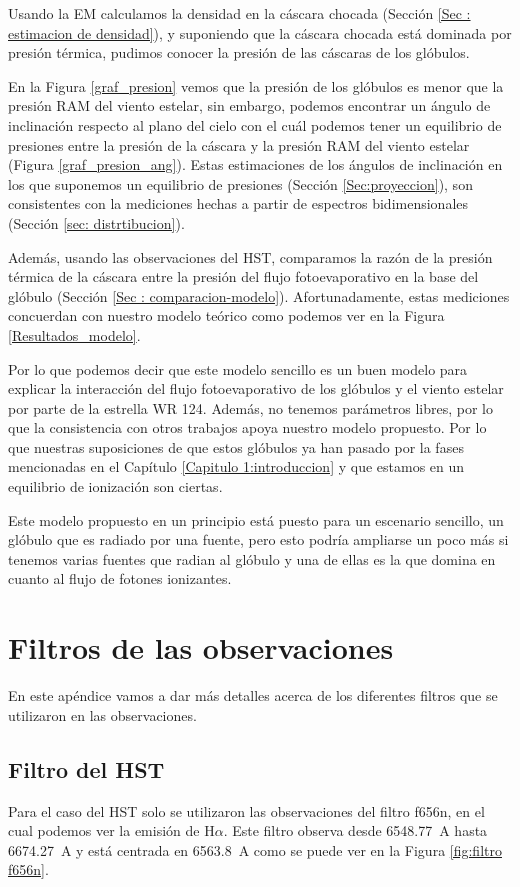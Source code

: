 \documentclass{book}
\begin{document}
Usando la EM calculamos la densidad en la cáscara chocada (Sección
\ref{Sec : estimacion de densidad}), y suponiendo que la cáscara
chocada está dominada por presión térmica, pudimos conocer la presión
de las cáscaras de los glóbulos.

En la Figura \ref{graf_presion} vemos que la presión de los glóbulos
es menor que la presión RAM del viento estelar, sin embargo, podemos
encontrar un ángulo de inclinación respecto al plano del cielo con el
cuál podemos tener un equilibrio de presiones entre la presión de la
cáscara y la presión RAM del viento estelar (Figura
\ref{graf_presion_ang}). Estas estimaciones de los ángulos de
inclinación en los que suponemos un equilibrio de presiones (Sección
\ref{Sec:proyeccion}), son consistentes con la mediciones hechas a
partir de espectros bidimensionales (Sección \ref{sec:
  distrtibucion}).

Además, usando las observaciones del HST, comparamos la razón de la
presión térmica de la cáscara entre la presión del flujo
fotoevaporativo en la base del glóbulo (Sección \ref{Sec :
  comparacion-modelo}). Afortunadamente, estas mediciones concuerdan
con nuestro modelo teórico como podemos ver en la Figura
\ref{Resultados_modelo}.

Por lo que podemos decir que este modelo sencillo es un buen modelo
para explicar la interacción del flujo fotoevaporativo de los glóbulos
y el viento estelar por parte de la estrella WR 124. Además, no
tenemos parámetros libres, por lo que la consistencia con otros
trabajos apoya nuestro modelo propuesto. Por lo que nuestras
suposiciones de que estos glóbulos ya han pasado por la fases
mencionadas en el Capítulo \ref{Capitulo 1:introduccion} y que estamos
en un equilibrio de ionización son ciertas.

Este modelo propuesto en un principio está puesto para un escenario
sencillo, un glóbulo que es radiado por una fuente, pero esto podría
ampliarse un poco más si tenemos varias fuentes que radian al glóbulo
y una de ellas es la que domina en cuanto al flujo de fotones
ionizantes.

\appendix

\chapter{Filtros de las observaciones}\label{App: Filtros}

En este apéndice vamos a dar más detalles acerca de los diferentes
filtros que se utilizaron en las observaciones.
\section{Filtro del HST}
Para el caso del HST solo se utilizaron las observaciones del filtro
f656n, en el cual podemos ver la emisión de H$\alpha$. Este filtro observa
desde \SI{6548.77}{A} hasta \SI{6674.27}{A} y está centrada en
\SI{6563.8}{A} como se puede ver en la Figura \ref{fig:filtro f656n}.
\end{document}
